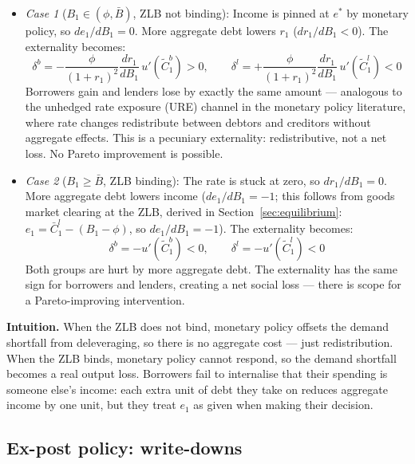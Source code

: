 \documentclass[11pt,a4paper]{article}
\begin{document}
\begin{itemize}
    \item \textit{Case 1} ($B_1 \in (\phi, \bar{B})$, ZLB not binding): Income is pinned at $e^*$ by monetary policy, so $de_1/dB_1 = 0$. More aggregate debt lowers $r_1$ ($dr_1/dB_1 < 0$). The externality becomes:
    \begin{equation}
    \delta^b = -\frac{\phi}{(1+r_1)^2}\frac{dr_1}{dB_1}\,u'(\tilde{C}_1^b) > 0, \qquad \delta^l = +\frac{\phi}{(1+r_1)^2}\frac{dr_1}{dB_1}\,u'(\tilde{C}_1^l) < 0
    \end{equation}
    Borrowers gain and lenders lose by exactly the same amount --- analogous to the unhedged rate exposure (URE) channel in the monetary policy literature, where rate changes redistribute between debtors and creditors without aggregate effects. This is a pecuniary externality: redistributive, not a net loss. No Pareto improvement is possible.

    \item \textit{Case 2} ($B_1 \geq \bar{B}$, ZLB binding): The rate is stuck at zero, so $dr_1/dB_1 = 0$. More aggregate debt lowers income ($de_1/dB_1 = -1$; this follows from goods market clearing at the ZLB, derived in Section~\ref{sec:equilibrium}: $e_1 = \bar{C}_1^l - (B_1-\phi)$, so $de_1/dB_1 = -1$). The externality becomes:
    \begin{equation}
    \delta^b = -u'(\tilde{C}_1^b) < 0, \qquad \delta^l = -u'(\tilde{C}_1^l) < 0
    \end{equation}
    Both groups are hurt by more aggregate debt. The externality has the same sign for borrowers and lenders, creating a net social loss --- there is scope for a Pareto-improving intervention.
\end{itemize}

\textbf{Intuition.} When the ZLB does not bind, monetary policy offsets the demand shortfall from deleveraging, so there is no aggregate cost --- just redistribution. When the ZLB binds, monetary policy cannot respond, so the demand shortfall becomes a real output loss. Borrowers fail to internalise that their spending is someone else's income: each extra unit of debt they take on reduces aggregate income by one unit, but they treat $e_1$ as given when making their decision.

\subsection{Ex-post policy: write-downs}
\end{document}
